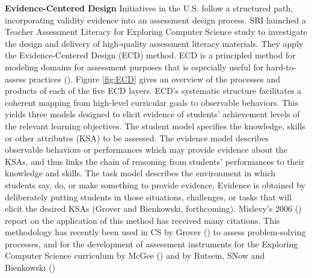 

%



\textbf{Evidence-Centered Design}\newline
Initiatives in the U.S. follow a structured path, incorporating validity evidence into an assessment design process. SRI launched a Teacher Assessment Literacy for Exploring Computer Science study to investigate the design and delivery of high-quality assessment literacy materials. They apply the Evidence-Centered Design (ECD) method. ECD is a principled method for modeling domains for assessment purposes that is especially useful for hard-to-assess practices (\cite{grover2016assessing}). Figure \ref{fig:ECD} gives an overview of the processes and products of each of the five ECD layers. ECD's systematic structure facilitates a coherent mapping from high-level curricular goals to observable behaviors. This yields three models designed to elicit evidence of students' achievement levels of the relevant learning objectives. The student model specifies the knowledge, skills or other attributes (KSA) to be assessed. The evidence model describes observable behaviors or performances which may provide evidence about the KSAs, and thus links the chain of reasoning from students’ performances to their knowledge and skills. The task model describes the environment in which students say, do, or make something to provide evidence. Evidence is obtained by deliberately putting students in those situations, challenges, or tasks that will elicit the desired KSAs (Grover and Bienkowski, forthcoming). Mislevy's 2006 (\cite{mislevy2006implications}) report on the application of this method has received many citations. This methodology has recently been used in CS by Grover (\cite{grover2017measuring}) to assess problem-solving processes, and for the development of assessment instruments for the Exploring Computer Science curriculum by McGee (\cite{McGee2018ECS}) and by Rutsein, SNow and Bienkowski (\cite{rutstein2014computational}\cite{snow2017CTECD})





